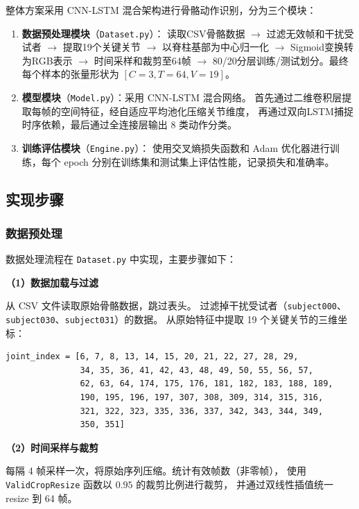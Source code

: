 \documentclass[UTF8]{ctexart}
\begin{document}
整体方案采用 CNN-LSTM 混合架构进行骨骼动作识别，分为三个模块：

\begin{enumerate}
  \item \textbf{数据预处理模块}（\texttt{Dataset.py}）：
        读取CSV骨骼数据 $\rightarrow$ 过滤无效帧和干扰受试者 $\rightarrow$ 
        提取19个关键关节 $\rightarrow$ 以脊柱基部为中心归一化 $\rightarrow$ 
        Sigmoid变换转为RGB表示 $\rightarrow$ 时间采样和裁剪至64帧 $\rightarrow$ 
        80/20分层训练/测试划分。最终每个样本的张量形状为 $[C=3, T=64, V=19]$。
  \item \textbf{模型模块}（\texttt{Model.py}）：采用 CNN-LSTM 混合网络。
        首先通过二维卷积层提取每帧的空间特征，经自适应平均池化压缩关节维度，
        再通过双向LSTM捕捉时序依赖，最后通过全连接层输出 8 类动作分类。
  \item \textbf{训练评估模块}（\texttt{Engine.py}）：
  使用交叉熵损失函数和 Adam 优化器进行训练，每个 epoch 分别在训练集和测试集上评估性能，记录损失和准确率。
\end{enumerate}

\subsection{实现步骤}

\subsubsection{数据预处理}

数据处理流程在 \texttt{Dataset.py} 中实现，主要步骤如下：

\textbf{（1）数据加载与过滤}

从 CSV 文件读取原始骨骼数据，跳过表头。
过滤掉干扰受试者（\texttt{subject000}、\texttt{subject030}、\texttt{subject031}）的数据。
从原始特征中提取 19 个关键关节的三维坐标：

\begin{verbatim}
joint_index = [6, 7, 8, 13, 14, 15, 20, 21, 22, 27, 28, 29,
               34, 35, 36, 41, 42, 43, 48, 49, 50, 55, 56, 57,
               62, 63, 64, 174, 175, 176, 181, 182, 183, 188, 189,
               190, 195, 196, 197, 307, 308, 309, 314, 315, 316,
               321, 322, 323, 335, 336, 337, 342, 343, 344, 349,
               350, 351]
\end{verbatim}

\textbf{（2）时间采样与裁剪}

每隔 4 帧采样一次，将原始序列压缩。统计有效帧数（非零帧），
使用 \texttt{ValidCropResize} 函数以 $0.95$ 的裁剪比例进行裁剪，
并通过双线性插值统一 resize 到 64 帧。
\end{document}
